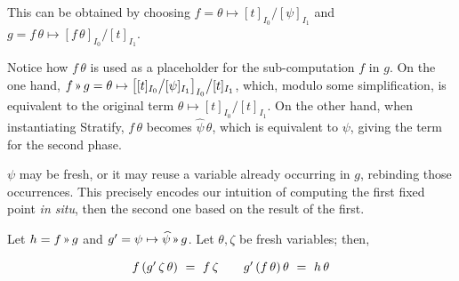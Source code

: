 \begin{center}
\end{center}

This can be obtained by choosing 
$f=\theta\mapsto[t]_{I_0}\big/[\psi]_{I_1}$
and
$g=f\,\theta \mapsto [f\,\theta]_{I_0}\big/[t]_{I_1}$.

Notice how $f\,\theta$ is used as a placeholder for the sub-computation $f$ in $g$.
On the one hand, $f\applt g = \theta\mapsto\big[[t]_{I_0}\big/[\psi]_{I_1}\big]_{I_0}\big/[t]_{I_1}$, which,
modulo some simplification, is equivalent to the original term $\theta\mapsto[t]_{I_0}\big/[t]_{I_1}$.
On the other hand, when instantiating \textsf{Stratify}, $f\,\theta$ becomes $\widehat\psi\,\theta$, 
which is equivalent to $\psi$, giving the term for the second phase.
\cbend

$\psi$ may be fresh, or it may reuse a variable already occurring in $g$, rebinding those occurrences.
This precisely encodes our intuition of computing the first fixed point \textit{in situ},
then the second one based on the result of the first.

\Obligations Let $h=f\applt g$ and $g'=\psi\mapsto\widehat\psi\applt g$. Let $\theta,\zeta$ be
fresh variables; then,\vspace{-.3em}
\begin{equation}
\renewcommand\arraystretch{1.5}
\begin{array}{l@{\qquad}l}
f\,(g'\,\zeta\,\theta) ~=~ f\,\zeta &
g'\,(f\,\theta)\,\theta ~=~ h\,\theta
\end{array}
\label{tactics:Stratify obligations}
\end{equation}


